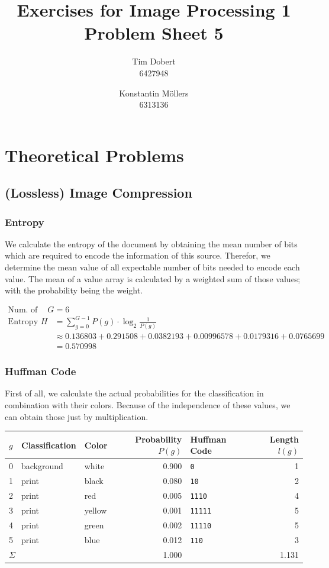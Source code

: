 \documentclass[a4paper,12pt]{article}
\title{\textbf{Exercises for Image Processing 1}\\Problem Sheet 5}
\author{Tim Dobert\\6427948 \and Konstantin M\"ollers\\6313136}
\begin{document}
	\maketitle	
	
	\section{Theoretical Problems}
	\subsection{(Lossless) Image Compression}
	
	\subsubsection{Entropy}
	
	We calculate the entropy of the document by obtaining the mean number of bits which are required to encode the information of this source. Therefor, we determine the mean value of all expectable number of bits needed to encode each value. The mean of a value array is calculated by a weighted sum of those values; with the probability being the weight.
	
	\begin{align*}
	\text{Num. of values }G	&= 6 \\
	\text{Entropy } H 	&= \sum\limits_{g = 0}^{G - 1} P(g) \cdot \log_2 \frac{1}{P(g)} 	\\
		&\approx 0.136803+ 0.291508+ 0.0382193+ 0.00996578+ 0.0179316+ 0.0765699\\
		&= 0.570998
	\end{align*}
	
	\subsubsection{Huffman Code}
	
	First of all, we calculate the actual probabilities for the classification in combination with their colors. Because of the independence of these values, we can obtain those just by multiplication.
	
	\begin{table}[h!]
		\centering
		\begin{tabular}{l|l|l|r|l|r}
			$g$ & \textbf{Classification} & \textbf{Color} & \textbf{Probability} $P(g)$ & \textbf{Huffman Code} & \textbf{Length} $l(g)$ \\\hline
			0 & background & white & 0.900 & \texttt{0} & 1 \\
			1 & print & black & 0.080 & \texttt{10} & 2 \\
			2 & print & red & 0.005 & \texttt{1110} & 4\\
			3 & print & yellow & 0.001 & \texttt{11111} & 5\\
			4 & print & green & 0.002 & \texttt{11110} & 5\\
			5 & print & blue & 0.012 & \texttt{110} & 3\\\hline
			\multicolumn{3}{l|}{$\Sigma$} & 1.000 & \multicolumn{2}{r}{1.131}
		\end{tabular}
	\end{table}
	
\end{document}
